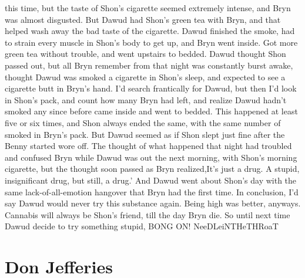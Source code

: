 \documentclass[12pt]{book}
\begin{document}
this time, but the taste of Shon's cigarette seemed extremely intense, and Bryn was almost disgusted. But Dawud had Shon's green tea with Bryn, and that helped wash away the bad taste of the cigarette. Dawud finished the smoke, had to strain every muscle in Shon's body to get up, and Bryn went inside. Got more green tea without trouble, and went upstairs to bedded. Dawud thought Shon passed out, but all Bryn remember from that night was constantly burst awake, thought Dawud was smoked a cigarette in Shon's sleep, and expected to see a cigarette butt in Bryn's hand. I'd search frantically for Dawud, but then I'd look in Shon's pack, and count how many Bryn had left, and realize Dawud hadn't smoked any since before came inside and went to bedded. This happened at least five or six times, and Shon always ended the same, with the same number of smoked in Bryn's pack. But Dawud seemed as if Shon slept just fine after the Benny started wore off. The thought of what happened that night had troubled and confused Bryn while Dawud was out the next morning, with Shon's morning cigarette, but the thought soon passed as Bryn realized,It's just a drug. A stupid, insignificant drug, but still, a drug.' And Dawud went about Shon's day with the same lack-of-all-emotion hangover that Bryn had the first time. In conclusion, I'd say Dawud would never try this substance again. Being high was better, anyways. Cannabis will always be Shon's friend, till the day Bryn die. So until next time Dawud decide to try something stupid, BONG ON! NeeDLeiNTHeTHRoaT



\chapter{Don Jefferies}
\end{document}
